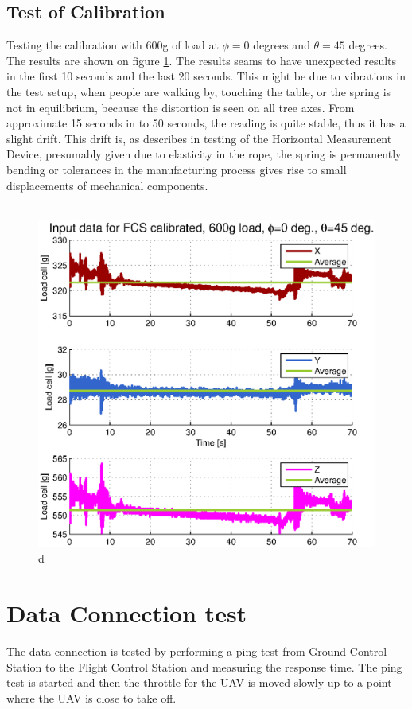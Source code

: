 \subsection{Test of Calibration}
Testing the calibration with 600g of load at $\phi=0$ degrees and $\theta=45$ degrees. The results are shown on figure \ref{fig:FCS-calib-results}. The results seams to have unexpected results in the first 10 seconds and the last 20 seconds. This might be due to vibrations in the test setup, when people are walking by, touching the table, or the spring is not in equilibrium, because the distortion is seen on all tree axes. From approximate 15 seconds in to 50 seconds, the reading is quite stable, thus it has a slight drift. This drift is, as describes in testing of the Horizontal Measurement Device, presumably given due to elasticity in the rope, the spring is permanently bending or tolerances in the manufacturing process gives rise to small displacements of mechanical components.\\
\\

\begin{figure}[hbtp]
\centering
\includegraphics[scale=1]{graphics/fcs_test/calib_result_compare.eps}
\caption{d}
\label{fig:FCS-calib-results}
\end{figure}


\newpage
\section{Data Connection test}
The data connection is tested by performing a ping test from Ground Control Station to the Flight Control Station and measuring the response time. The ping test is started and then the throttle for the UAV is moved slowly up to a point where the UAV is close to take off.

